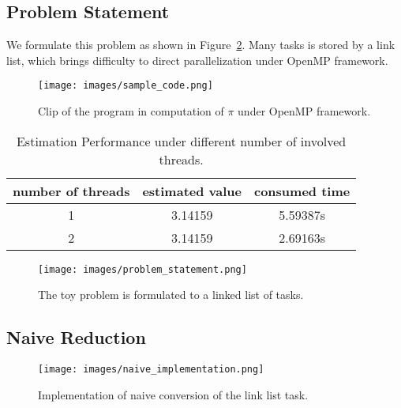 \documentclass[10pt,twocolumn,letterpaper]{article}
\begin{document}
    \subsection{Problem Statement}
    We formulate this problem as shown in Figure~\ref{problem_statement}. Many tasks
    is stored by a link list, which brings difficulty to direct parallelization under
    OpenMP framework. 
    \begin{figure}[t]
        \begin{center}
           \texttt{[image: images/sample\_code.png]}
        \end{center}
           \caption{Clip of the program in computation of $\pi$ under OpenMP framework.}
        \label{fig:long}
        \label{fig:onecol}
        \label{sample_code}
    \end{figure}
    \begin{table}
        \begin{center}
        \begin{tabular}{|c|c|c|}
        \hline
        number of threads & estimated value & consumed time\\
        \hline
        1 & 3.14159 &5.59387s \\
        2 & 3.14159 &2.69163s \\
        \hline
        \end{tabular}
        \end{center}
        \caption{Estimation Performance under different number of involved threads.}
        \label{estimation_performance}
    \end{table}
    \begin{figure}[t]
        \begin{center}
           \texttt{[image: images/problem\_statement.png]}
        \end{center}
           \caption{The toy problem is formulated to a linked list of tasks.}
        \label{fig:long}
        \label{fig:onecol}
        \label{problem_statement}
    \end{figure}

    \subsection{Naive Reduction}
    \begin{figure}[t]
        \begin{center}
           \texttt{[image: images/naive\_implementation.png]}
        \end{center}
           \caption{Implementation of naive conversion of the link list task.}
        \label{fig:long}
        \label{fig:onecol}
        \label{naive_implementation}
    \end{figure}
\end{document}
